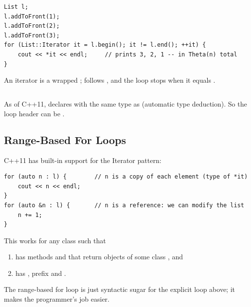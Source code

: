 \begin{lstlisting}[style=cpp]
List l;
l.addToFront(1);
l.addToFront(2);
l.addToFront(3);
for (List::Iterator it = l.begin(); it != l.end(); ++it) {
    cout << *it << endl;     // prints 3, 2, 1 -- in Theta(n) total
}
\end{lstlisting}
\begin{center}

\small An iterator is a wrapped ; \code{++} follows , and the loop stops when it equals .
\end{center}

\subsection{}
As of C++11,  declares  with the same type as
 (automatic type deduction). So the loop header can be
.

\subsection{Range-Based For Loops}
C++11 has built-in support for the Iterator pattern:
\begin{lstlisting}[style=cpp]
for (auto n : l) {        // n is a copy of each element (type of *it)
    cout << n << endl;
}
for (auto &n : l) {       // n is a reference: we can modify the list
    n += 1;
}
\end{lstlisting}
This works for any class  such that
\begin{enumerate}
  \item {} has methods  and  that return objects
        of some class , and
  \item {} has , prefix  and
        .
\end{enumerate}
The range-based for loop is just syntactic sugar for the explicit loop above;
it makes the programmer's job easier.

